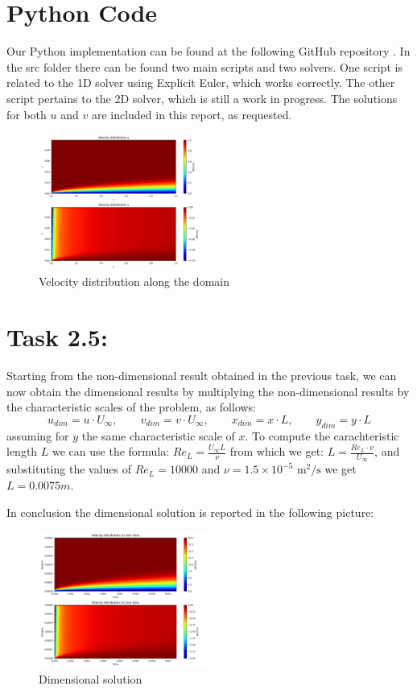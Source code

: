 \documentclass{article}
\begin{document}
\section*{Python Code}
Our Python implementation can be found at the following GitHub repository \cite{GitHubRepo}. In the src folder there can be found two main scripts and two solvers.
One script is related to the 1D solver using Explicit Euler, which works correctly. The other script pertains to the 2D solver, which is still a work in progress. 
The solutions for both \( u \) and \( v \) are included in this report, as requested.
\begin{figure}[h!]
  \centering
  \includegraphics[width=0.5\textwidth]{velocity_distribution.png}
  \caption{Velocity distribution along the domain}
  \label{fig:velocity_distribution}
\end{figure}


\section*{\Large Task 2.5:}
Starting from the non-dimensional result obtained in the previous task, we can now obtain the dimensional results by multiplying the non-dimensional results by the characteristic scales of the problem, as follows:
\[
u_{dim} = u \cdot U_{\infty}, \qquad v_{dim} = v \cdot U_{\infty}, \qquad x_{dim} = x \cdot L, \qquad y_{dim} = y \cdot L
\]
assuming for $y$ the same characteristic scale of $x$.
To compute the carachteristic length $L$ we can use the formula: $Re_L = \frac{U_{\infty} L}{\nu}$
from which we get: $L = \frac{Re_L \cdot \nu}{U_{\infty}}$, and substituting the values of $Re_L = 10000$ and $\nu = 1.5 \times 10^{-5} \text{ m}^2/\text{s}$ we get $L = 0.0075 m$.

In conclusion the dimensional solution is reported in the following picture:
\begin{figure}[h!]
  \centering
  \includegraphics[width=0.5\textwidth]{result2.png}
  \caption{Dimensional solution}
\end{figure}
\end{document}
